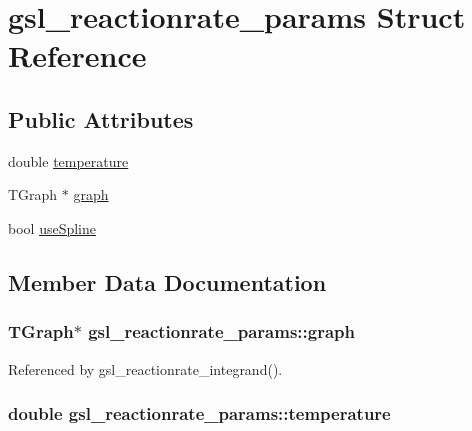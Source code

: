 \hypertarget{structgsl__reactionrate__params}{\section{gsl\-\_\-reactionrate\-\_\-params Struct Reference}
\label{structgsl__reactionrate__params}
}
\subsection*{Public Attributes}
\begin{DoxyCompactItemize}
\item 
double \hyperlink{structgsl__reactionrate__params_a207cb264645c40bd2cbac28328e8c48f}{temperature}
\item 
T\-Graph $\ast$ \hyperlink{structgsl__reactionrate__params_a58f7496d7c40bbb4df13305ba1ed0c77}{graph}
\item 
bool \hyperlink{structgsl__reactionrate__params_ac8d064fc50f87de0d067926ba0f2abb7}{use\-Spline}
\end{DoxyCompactItemize}


\subsection{Member Data Documentation}
\hypertarget{structgsl__reactionrate__params_a58f7496d7c40bbb4df13305ba1ed0c77}{
\subsubsection[{graph}]{\setlength{\rightskip}{0pt plus 5cm}T\-Graph$\ast$ gsl\-\_\-reactionrate\-\_\-params\-::graph}}\label{structgsl__reactionrate__params_a58f7496d7c40bbb4df13305ba1ed0c77}


Referenced by gsl\-\_\-reactionrate\-\_\-integrand().

\hypertarget{structgsl__reactionrate__params_a207cb264645c40bd2cbac28328e8c48f}{
\subsubsection[{temperature}]{\setlength{\rightskip}{0pt plus 5cm}double gsl\-\_\-reactionrate\-\_\-params\-::temperature}}\label{structgsl__reactionrate__params_a207cb264645c40bd2cbac28328e8c48f}


